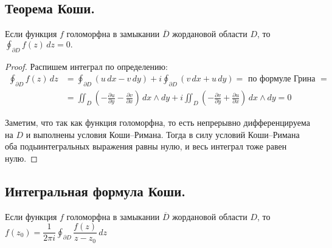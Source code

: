\subsection*{Теорема Коши.}
\begin{theorem*}
	Если функция $f$ голоморфна в замыкании $\overline{D}$ жордановой области $D$, то $\oint_{\partial D} f(z)\,dz = 0.$
\end{theorem*}
\begin{proof}
	Распишем интеграл по определению:
	\begin{align*}
		\oint_{\partial D} f(z)\,dz &= 	\oint_{\partial D} (u\,dx - v\,dy) + i 	\oint_{\partial D} (v\,dx + u\, dy) = \text{ по формуле Грина } = \\		
		&= \iint_{D} \left(-\frac{\partial u}{\partial y} - \frac{\partial v}{\partial x}\right)\, dx \wedge dy + i \iint_{D} \left(-\frac{\partial v}{\partial y} + \frac{\partial u}{\partial x}\right)\, dx \wedge dy  = 0
	\end{align*}

	Заметим, что так как функция голоморфна, то есть непрерывно дифференцируема на $D$ и выполнены условия Коши--Римана. Тогда в силу условий Коши--Римана оба подыинтегральных выражения равны нулю, и весь интеграл тоже равен нулю.
\end{proof}	

\subsection*{Интегральная формула Коши.}
	Если функция $f$ голоморфна в замыкании $\overline{D}$ жордановой области $D$, то $f(z_0) = \dfrac{1}{2\pi i} \oint_{\partial D} \dfrac{f(z)}{z - z_0}\, dz$